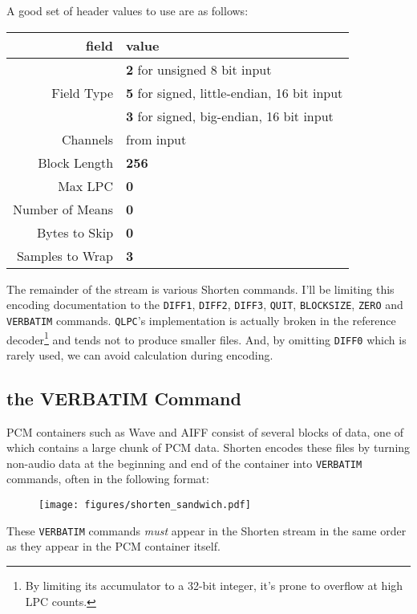 A good set of header values to use are as follows:
\begin{table}[h]
\begin{tabular}{|r|l|}
\hline
field & value \\
\hline
& \textbf{2} for unsigned 8 bit input \\
Field Type & \textbf{5} for signed, little-endian, 16 bit input \\
& \textbf{3} for signed, big-endian, 16 bit input \\
Channels & from input \\
Block Length & \textbf{256} \\
Max LPC & \textbf{0} \\
Number of Means & \textbf{0} \\
Bytes to Skip & \textbf{0} \\
Samples to Wrap & \textbf{3} \\
\hline
\end{tabular}
\end{table}
\par
\noindent
The remainder of the stream is various Shorten commands.
I'll be limiting this encoding documentation to the \texttt{DIFF1},
\texttt{DIFF2}, \texttt{DIFF3}, \texttt{QUIT}, \texttt{BLOCKSIZE},
\texttt{ZERO} and \texttt{VERBATIM} commands.
\texttt{QLPC}'s implementation is actually broken in the reference
decoder\footnote{By limiting its accumulator to a 32-bit integer,
it's prone to overflow at high LPC counts.} and tends not to
produce smaller files.
And, by omitting \texttt{DIFF0} which is rarely used,
we can avoid  calculation during encoding.

\pagebreak

\subsection{the VERBATIM Command}

PCM containers such as Wave and AIFF consist of
several blocks of data, one of which contains a large chunk of
PCM data.
Shorten encodes these files by turning non-audio data at
the beginning and end of the container into \texttt{VERBATIM} commands,
often in the following format:
\begin{figure}[h]
\texttt{[image: figures/shorten\_sandwich.pdf]}
\end{figure}
\par
\noindent
These \texttt{VERBATIM} commands \textit{must} appear in
the Shorten stream in the same order as they appear in the
PCM container itself.

